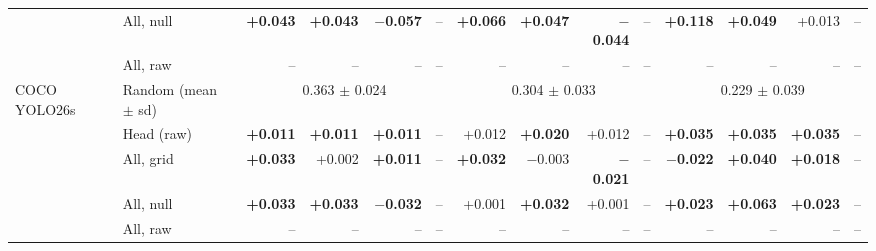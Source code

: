 \begin{tabular}{llrrrrrrrrrrrr}
 & All, null & \textbf{+0.043} & \textbf{+0.043} & \textbf{$-$0.057} & -- & \textbf{+0.066} & \textbf{+0.047} & \textbf{$-$0.044} & -- & \textbf{+0.118} & \textbf{+0.049} & +0.013 & -- \\
 & All, raw & -- & -- & -- & -- & -- & -- & -- & -- & -- & -- & -- & -- \\
\midrule
COCO YOLO26s & Random (mean $\pm$ sd) & \multicolumn{4}{c}{0.363 $\pm$ 0.024} & \multicolumn{4}{c}{0.304 $\pm$ 0.033} & \multicolumn{4}{c}{0.229 $\pm$ 0.039} \\
 & Head (raw) & \textbf{+0.011} & \textbf{+0.011} & \textbf{+0.011} & -- & +0.012 & \textbf{+0.020} & +0.012 & -- & \textbf{+0.035} & \textbf{+0.035} & \textbf{+0.035} & -- \\
 & All, grid & \textbf{+0.033} & +0.002 & \textbf{+0.011} & -- & \textbf{+0.032} & $-$0.003 & \textbf{$-$0.021} & -- & \textbf{$-$0.022} & \textbf{+0.040} & \textbf{+0.018} & -- \\
 & All, null & \textbf{+0.033} & \textbf{+0.033} & \textbf{$-$0.032} & -- & +0.001 & \textbf{+0.032} & +0.001 & -- & \textbf{+0.023} & \textbf{+0.063} & \textbf{+0.023} & -- \\
 & All, raw & -- & -- & -- & -- & -- & -- & -- & -- & -- & -- & -- & -- \\
\bottomrule
\end{tabular}
